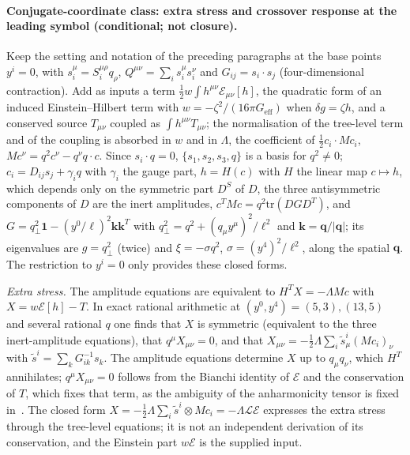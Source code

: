 \paragraph{Conjugate-coordinate class: extra stress and crossover response at the leading symbol (conditional; not closure).}
Keep the setting and notation of the preceding paragraphs at the base points \(y^i=0\), with \(s_i^\mu=S_i^{\mu\rho}q_\rho\), \(Q^{\mu\nu}=\sum_is_i^\mu s_i^\nu\) and \(G_{ij}=s_i\!\cdot\! s_j\) (four-dimensional contraction). Add as inputs a term \(\tfrac12w\int h^{\mu\nu}\mathcal E_{\mu\nu}[h]\), the quadratic form of an induced Einstein--Hilbert term with \(w=-\zeta^2/(16\pi G_{\mathrm{eff}})\) when \(\delta g=\zeta h\), and a conserved source \(T_{\mu\nu}\) coupled as \(\int h^{\mu\nu}T_{\mu\nu}\); the normalisation of the tree-level term and of the coupling is absorbed in \(w\) and in \(\Lambda\), the coefficient of \(\tfrac12c_i\cdot Mc_i\), \(Mc^\nu=q^2c^\nu-q^\nu q\!\cdot\! c\). Since \(s_i\!\cdot\! q=0\), \(\{s_1,s_2,s_3,q\}\) is a basis for \(q^2\neq0\); \(c_i=D_{ij}s_j+\gamma_iq\) with \(\gamma_i\) the gauge part, \(h=H(c)\) with \(H\) the linear map \(c\mapsto h\), which depends only on the symmetric part \(D^{S}\) of \(D\), the three antisymmetric components of \(D\) are the inert amplitudes, \(c^TMc=q^2\mathrm{tr}(DGD^T)\), and \(G=q_\perp^2\mathbf 1-(y^0/\ell)^2\mathbf k\mathbf k^T\) with \(q_\perp^2=q^2+(q_\mu y^\mu)^2/\ell^2\) and \(\mathbf k=\mathbf q/|\mathbf q|\); its eigenvalues are \(g=q_\perp^2\) (twice) and \(\xi=-\sigma q^2\), \(\sigma=(y^4)^2/\ell^2\), along the spatial \(\mathbf q\). The restriction to \(y^i=0\) only provides these closed forms.

\emph{Extra stress.} The amplitude equations are equivalent to \(H^{T}X=-\Lambda Mc\) with \(X=w\mathcal E[h]-T\). In exact rational arithmetic at \((y^0,y^4)=(5,3),(13,5)\) and several rational \(q\) one finds that \(X\) is symmetric (equivalent to the three inert-amplitude equations), that \(q^\mu X_{\mu\nu}=0\), and that \(X_{\mu\nu}=-\tfrac12\Lambda\sum_i\tilde s^i_\mu(Mc_i)_\nu\) with \(\tilde s^i=\sum_kG^{-1}_{ik}s_k\). The amplitude equations determine \(X\) up to \(q_\mu q_\nu\), which \(H^T\) annihilates; \(q^\mu X_{\mu\nu}=0\) follows from the Bianchi identity of \(\mathcal E\) and the conservation of \(T\), which fixes that term, as the ambiguity of the anharmonicity tensor is fixed in~\cite{KumarSteinacker2023,Steinacker2026}. The closed form \(X=-\tfrac12\Lambda\sum_i\tilde s^i\otimes Mc_i=-\Lambda\mathcal L\mathcal E\) expresses the extra stress through the tree-level equations; it is not an independent derivation of its conservation, and the Einstein part \(w\mathcal E\) is the supplied input.

